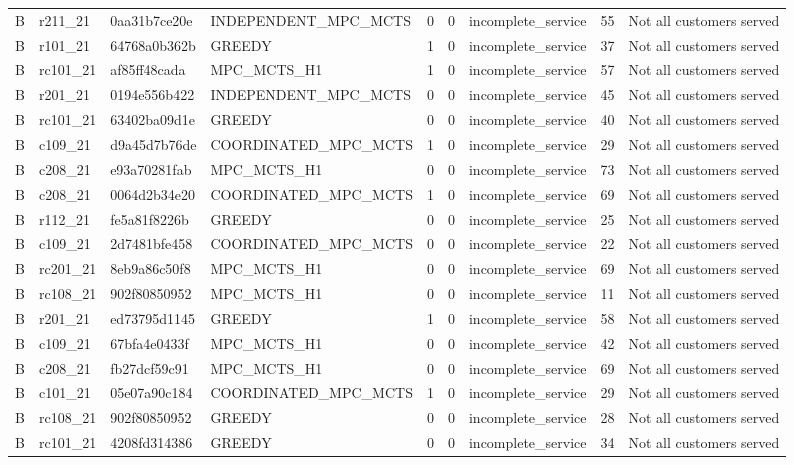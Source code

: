 \begin{table}
{\begin{tabular}{llllrrlrl}
B & r211\_21 & 0aa31b7ce20e & INDEPENDENT\_MPC\_MCTS & 0 & 0 & incomplete\_service & 55 & Not all customers served \\
B & r101\_21 & 64768a0b362b & GREEDY & 1 & 0 & incomplete\_service & 37 & Not all customers served \\
B & rc101\_21 & af85ff48cada & MPC\_MCTS\_H1 & 1 & 0 & incomplete\_service & 57 & Not all customers served \\
B & r201\_21 & 0194e556b422 & INDEPENDENT\_MPC\_MCTS & 0 & 0 & incomplete\_service & 45 & Not all customers served \\
B & rc101\_21 & 63402ba09d1e & GREEDY & 0 & 0 & incomplete\_service & 40 & Not all customers served \\
B & c109\_21 & d9a45d7b76de & COORDINATED\_MPC\_MCTS & 1 & 0 & incomplete\_service & 29 & Not all customers served \\
B & c208\_21 & e93a70281fab & MPC\_MCTS\_H1 & 0 & 0 & incomplete\_service & 73 & Not all customers served \\
B & c208\_21 & 0064d2b34e20 & COORDINATED\_MPC\_MCTS & 1 & 0 & incomplete\_service & 69 & Not all customers served \\
B & r112\_21 & fe5a81f8226b & GREEDY & 0 & 0 & incomplete\_service & 25 & Not all customers served \\
B & c109\_21 & 2d7481bfe458 & COORDINATED\_MPC\_MCTS & 0 & 0 & incomplete\_service & 22 & Not all customers served \\
B & rc201\_21 & 8eb9a86c50f8 & MPC\_MCTS\_H1 & 0 & 0 & incomplete\_service & 69 & Not all customers served \\
B & rc108\_21 & 902f80850952 & MPC\_MCTS\_H1 & 0 & 0 & incomplete\_service & 11 & Not all customers served \\
B & r201\_21 & ed73795d1145 & GREEDY & 1 & 0 & incomplete\_service & 58 & Not all customers served \\
B & c109\_21 & 67bfa4e0433f & MPC\_MCTS\_H1 & 0 & 0 & incomplete\_service & 42 & Not all customers served \\
B & c208\_21 & fb27dcf59c91 & MPC\_MCTS\_H1 & 0 & 0 & incomplete\_service & 69 & Not all customers served \\
B & c101\_21 & 05e07a90c184 & COORDINATED\_MPC\_MCTS & 1 & 0 & incomplete\_service & 29 & Not all customers served \\
B & rc108\_21 & 902f80850952 & GREEDY & 0 & 0 & incomplete\_service & 28 & Not all customers served \\
B & rc101\_21 & 4208fd314386 & GREEDY & 0 & 0 & incomplete\_service & 34 & Not all customers served \\

\end{tabular}}
\end{table}

